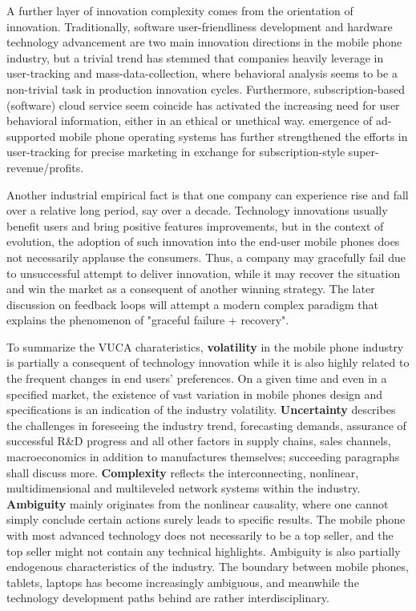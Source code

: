 \documentclass[utf8,english]{gradu3}
\begin{document}
A further layer of innovation complexity comes from the orientation of innovation. Traditionally, software user-friendliness development and hardware technology advancement are two main innovation directions in the mobile phone industry, but a trivial trend has stemmed that companies heavily leverage in user-tracking and mass-data-collection, where behavioral analysis seems to be a non-trivial task in production innovation cycles. Furthermore, subscription-based (software) cloud service seem coincide has activated the increasing need for user behavioral information, either in an ethical or unethical way. emergence of ad-supported mobile phone operating systems has further strengthened the efforts in user-tracking for precise marketing in exchange for subscription-style super-revenue/profits. 

Another industrial empirical fact is that one company can experience rise and fall over a relative long period, say over a decade. Technology innovations usually benefit users and bring positive features improvements, but in the context of evolution, the adoption of such innovation into the end-user mobile phones does not necessarily applause the consumers. Thus, a company may gracefully fail due to unsuccessful attempt to deliver innovation, while it may recover the situation and win the market as a consequent of another winning strategy. The later discussion on feedback loops will attempt a modern complex paradigm that explains the phenomenon of "graceful failure + recovery".

To summarize the VUCA charateristics, \textbf{volatility} in the mobile phone industry is partially a consequent of technology innovation while it is also highly related to the frequent changes in end users’ preferences. On a given time and even in a specified market, the existence of vast variation in mobile phones design and specifications is an indication of the industry volatility. \textbf{Uncertainty} describes the challenges in foreseeing the industry trend, forecasting demands, assurance of successful R\&D progress and all other factors in supply chains, sales channels, macroeconomics in addition to manufactures themselves; succeeding paragraphs shall discuss more. \textbf{Complexity} reflects the interconnecting, nonlinear, multidimensional and multileveled network systems within the industry. \textbf{Ambiguity} mainly originates from the nonlinear causality, where one cannot simply conclude certain actions surely leads to specific results. The mobile phone with most advanced technology does not necessarily to be a top seller, and the top seller might not contain any technical highlights. Ambiguity is also partially endogenous characteristics of the industry. The boundary between mobile phones, tablets, laptops has become increasingly ambiguous, and meanwhile the technology development paths behind are rather interdisciplinary.
\end{document}
